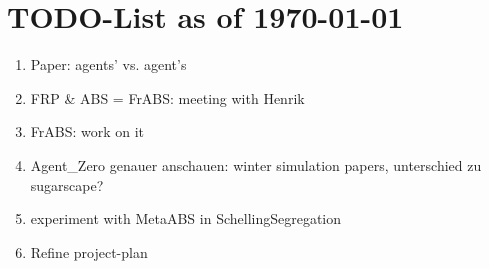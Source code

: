 \section{TODO-List as of \today}

\begin{enumerate}
	\item Paper: agents' vs. agent's
	\item FRP \& ABS = FrABS: meeting with Henrik
	\item FrABS: work on it
	\item Agent_Zero genauer anschauen: winter simulation papers, unterschied zu sugarscape?
	\item experiment with MetaABS in SchellingSegregation
	\item Refine project-plan 
\end{enumerate}